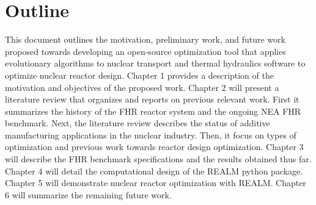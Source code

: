 \section{Outline}
This document outlines the motivation, preliminary work, and future work proposed 
towards developing an open-source optimization tool that applies evolutionary 
algorithms to nuclear transport and thermal hydraulics software to optimize 
nuclear reactor design. 
Chapter 1 provides a description of the motivation and objectives of the 
proposed work. 
Chapter 2 will present a literature review that organizes and reports on previous 
relevant work. 
First it summarizes the history of the \gls{FHR} reactor system and the ongoing 
\gls{NEA} \gls{FHR} benchmark. 
Next, the literature review describes the status of additive manufacturing 
applications in the nuclear industry. 
Then, it focus on types of optimization and previous work towards reactor design
optimization. 
Chapter 3 will describe the \gls{FHR} benchmark specifications and the results 
obtained thus far. 
Chapter 4 will detail the computational design of the REALM python package. 
Chapter 5 will demonstrate nuclear reactor optimization with REALM. 
Chapter 6 will summarize the remaining future work. 
